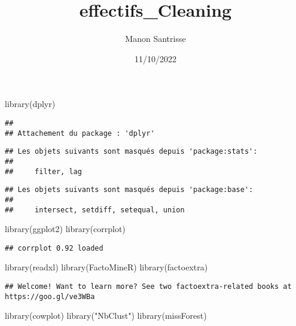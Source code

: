 \documentclass[
]{article}
\title{effectifs\_Cleaning}
\author{Manon Santrisse}
\date{11/10/2022}
\newenvironment{Shaded}{\begin{snugshade}}{\end{snugshade}}
\newcommand{\FunctionTok}[1]{\textcolor[rgb]{0.00,0.00,0.00}{#1}}
\newcommand{\NormalTok}[1]{#1}
\newcommand{\StringTok}[1]{\textcolor[rgb]{0.31,0.60,0.02}{#1}}
\begin{document}
\maketitle

\begin{Shaded}
\begin{Highlighting}[]
\FunctionTok{library}\NormalTok{(dplyr)}
\end{Highlighting}
\end{Shaded}

\begin{verbatim}
## 
## Attachement du package : 'dplyr'
\end{verbatim}

\begin{verbatim}
## Les objets suivants sont masqués depuis 'package:stats':
## 
##     filter, lag
\end{verbatim}

\begin{verbatim}
## Les objets suivants sont masqués depuis 'package:base':
## 
##     intersect, setdiff, setequal, union
\end{verbatim}

\begin{Shaded}
\begin{Highlighting}[]
\FunctionTok{library}\NormalTok{(ggplot2)}
\FunctionTok{library}\NormalTok{(corrplot)}
\end{Highlighting}
\end{Shaded}

\begin{verbatim}
## corrplot 0.92 loaded
\end{verbatim}

\begin{Shaded}
\begin{Highlighting}[]
\FunctionTok{library}\NormalTok{(readxl)}
\FunctionTok{library}\NormalTok{(FactoMineR)}
\FunctionTok{library}\NormalTok{(factoextra)}
\end{Highlighting}
\end{Shaded}

\begin{verbatim}
## Welcome! Want to learn more? See two factoextra-related books at https://goo.gl/ve3WBa
\end{verbatim}

\begin{Shaded}
\begin{Highlighting}[]
\FunctionTok{library}\NormalTok{(cowplot)}
\FunctionTok{library}\NormalTok{(}\StringTok{"NbClust"}\NormalTok{)}
\FunctionTok{library}\NormalTok{(missForest)}
\end{Highlighting}
\end{Shaded}
\end{document}
